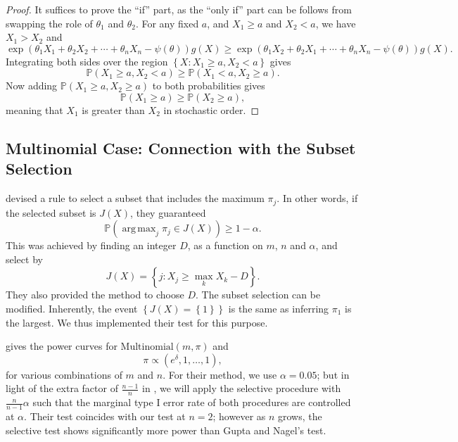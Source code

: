 \documentclass[11pt]{article}
\DeclareMathOperator*{\argmax}{arg\,max}
\newcommand{\PP}{\mathbb{P}}
\begin{document}
\begin{proof}
It suffices to prove the ``if'' part, as the ``only if'' part can be follows from swapping the role of $\theta_1$ and $\theta_2$. For any fixed $a$, and $X_1 \ge a$ and $X_2 < a$, we have $X_1 > X_2$ and
$$\exp\left(\theta_1 X_1 + \theta_2 X_2 + \cdots + \theta_n X_n - \psi\left(\theta\right)\right) g\left(X\right) \ge \exp\left(\theta_1 X_2 + \theta_2 X_1 + \cdots + \theta_n X_n - \psi\left(\theta\right)\right) g\left(X\right).$$
Integrating both sides over the region $\left\{X: X_1 \ge a, X_2 < a\right\}$ gives
$$\PP\left(X_1 \ge a, X_2 < a\right) \ge \PP\left(X_1 < a, X_2 \ge a\right).$$
Now adding $\PP\left(X_1 \ge a, X_2 \ge a\right)$ to both probabilities gives
$$\PP\left(X_1 \ge a\right) \ge \PP\left(X_2 \ge a\right),$$
meaning that $X_1$ is greater than $X_2$ in stochastic order.
\end{proof}

\subsection{Multinomial Case: Connection with the Subset Selection}
\label{sec:subsetsel}

\citet{Gupta:1967wg} devised a rule to select a subset that includes the maximum $\pi_j$. In other words, if the selected subset is $J\left(X\right)$, they guaranteed
$$\PP\left(\argmax_j \pi_j \in J\left(X\right)\right) \ge 1 - \alpha.$$
This was achieved by finding an integer $D$, as a function on $m$, $n$ and $\alpha$, and select by
$$J\left(X\right) = \left\{j: X_j \ge \max_k X_k - D\right\}.$$
They also provided the method to choose $D$. The subset selection can be modified. Inherently, the event $\left\{J\left(X\right) = \left\{1\right\}\right\}$ is the same as inferring $\pi_1$ is the largest. We thus implemented their test for this purpose.

 gives the power curves for $\text{Multinomial}\left(m, \pi\right)$ and
$$\pi \propto \left(e^\delta, 1, \ldots, 1\right),$$
for various combinations of $m$ and $n$. For their method, we use $\alpha = 0.05$; but in light of the extra factor of $\frac{n-1}{n}$ in , we will apply the selective procedure with $\frac{n}{n-1} \alpha$ such that the marginal type I error rate of both procedures are controlled at $\alpha$. Their test coincides with our test at $n = 2$; however as $n$ grows, the selective test shows significantly more power than Gupta and Nagel's test.
\end{document}
